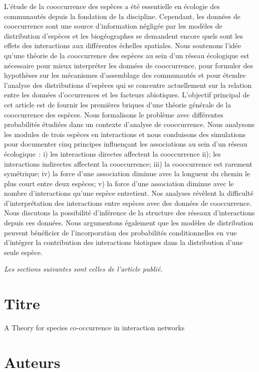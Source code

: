 L'étude de la cooccurrence des espèces a été essentielle en écologie des
communautés depuis la fondation de la discipline. Cependant,
les données de cooccurrence sont une source d'information négligée par
les modèles de distribution d'espèces et les biogéographes se demandent encore
quels sont les effets des interactions aux différentes échelles spatiales.
Nous soutenons l'idée qu'une théorie de la cooccurrence
des espèces au sein d'un réseau écologique est nécessaire pour mieux
interpréter les données de cooccurrence, pour formuler des hypothèses sur
les mécanismes d'assemblage des communautés et pour étendre l'analyse des
distributions d'espèces qui se concentre actuellement sur la relation entre les
données d'occurrences et les facteurs abiotiques. L'objectif principal de cet
article est de fournir les premières briques d'une théorie générale de la
cooccurrence des espèces. Nous formalisons le problème avec différentes
probabilités étudiées dans un contexte d'analyse de cooccurrence.
Nous analysons les modules de trois espèces en interactions et nous conduisons
des simulations pour documenter cinq principes influençant les associations au
sein d'un réseau écologique~: i) les interactions directes affectent la
cooccurrence ii); les interactions indirectes affectent la cooccurrence;
iii) la cooccurrence est rarement symétrique; iv) la force d'une association
diminue avec la longueur du chemin le plus court entre deux espèces;
v) la force d'une association diminue avec le nombre d'interactions
qu'une espèce entretient. Nos analyses révèlent la difficulté d'interprétation
des interactions entre espèces avec des données de cooccurrence.
Nous discutons la possibilité d'inférence de la structure des réseaux
d'interactions depuis ces données. Nous argumentons également que les modèles
de distribution peuvent bénéficier de l'incorporation des probabilités
conditionnelles en vue d'intégrer la contribution des interactions biotiques
dans la distribution d'une seule espèce.


\emph{Les sections suivantes sont celles de l'article publié.}





\section{Titre}

A Theory for species co-occurrence in interaction networks

\section{Auteurs}


